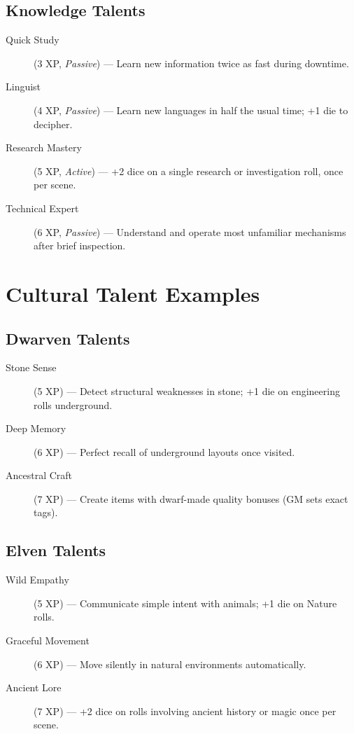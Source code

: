 \begin{multicols}{2}
\subsection*{Knowledge Talents}
\begin{description}
\item[Quick Study] (3 XP, \emph{Passive}) --- Learn new information twice as fast during downtime.
\item[Linguist] (4 XP, \emph{Passive}) --- Learn new languages in half the usual time; +1 die to decipher.
\item[Research Mastery] (5 XP, \emph{Active}) --- +2 dice on a single research or investigation roll, once per scene.
\item[Technical Expert] (6 XP, \emph{Passive}) --- Understand and operate most unfamiliar mechanisms after brief inspection.
\end{description}

\section{Cultural Talent Examples}

\subsection*{Dwarven Talents}
\begin{description}
\item[Stone Sense] (5 XP) --- Detect structural weaknesses in stone; +1 die on engineering rolls underground.
\item[Deep Memory] (6 XP) --- Perfect recall of underground layouts once visited.
\item[Ancestral Craft] (7 XP) --- Create items with dwarf-made quality bonuses (GM sets exact tags).
\end{description}

\subsection*{Elven Talents}
\begin{description}
\item[Wild Empathy] (5 XP) --- Communicate simple intent with animals; +1 die on Nature rolls.
\item[Graceful Movement] (6 XP) --- Move silently in natural environments automatically.
\item[Ancient Lore] (7 XP) --- +2 dice on rolls involving ancient history or magic once per scene.
\end{description}


\end{multicols}
